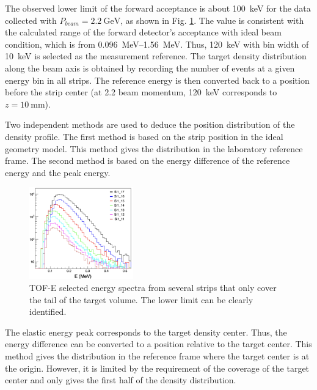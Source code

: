 \documentclass[fleqn,twocolumn,a4paper]{ikpar}
\begin{document}
The observed lower limit of the forward acceptance is about \SI{100}{\keV} for
the data collected with $P_{beam} = \SI{2.2}{\GeV}$, as shown in Fig. \ref{fig:spectrums}.
The value is consistent with the calculated range of the forward detector's
acceptance with ideal beam condition, which is from \SIrange{0.096}{1.56}{\MeV}.
Thus, \SI{120}{keV} with bin width of \SI{10}{\keV} is selected as the
measurement reference.
The target density distribution along the beam axis is obtained by recording the
number of events at a given energy bin in all strips.
The reference energy is then converted back to a position before the strip center
(at \SI{2.2}{\momentum} beam momentum, \SI{120}{\keV} corresponds to $z=\SI{10}{\mm}$).
\par
\medskip

Two independent methods are used to deduce the position distribution of the density profile.
The first method is based on the strip position in the ideal geometry model.
This method gives the distribution in the laboratory reference frame.
The second method is based on the energy difference of the reference energy and
the peak energy.
\begin{figure}[b!]
  \centering
	\includegraphics[width=0.4\textwidth]{./spectrums.png}
  \caption{TOF-E selected energy spectra from several strips that only cover the tail of the target volume. The lower limit can be clearly identified.}
  \label{fig:spectrums}
\end{figure}
The elastic energy peak corresponds to the target density center.
Thus, the energy difference can be converted to a position relative to the target center. 
This method gives the distribution in the reference frame where the
target center is at the origin.
However, it is limited by the requirement of the coverage of the target center
and only gives the first half of the density distribution.
\end{document}
